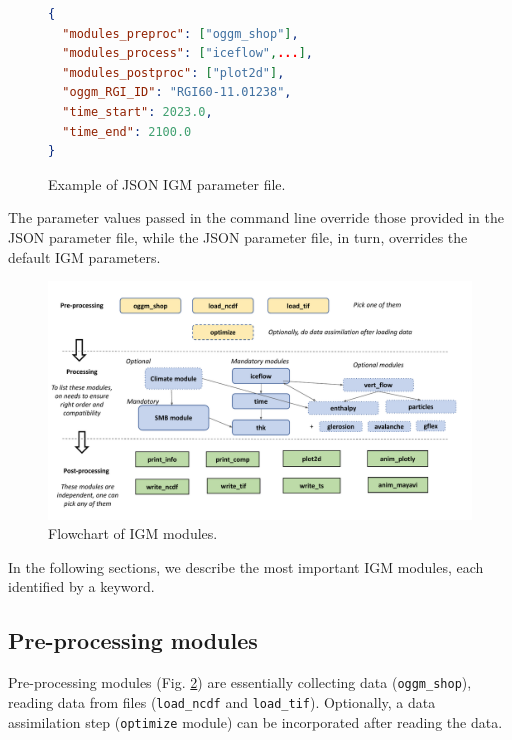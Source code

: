 \documentclass[10pt,twocolumn]{article}
\begin{document}
\begin{figure}[!h]  
\begin{lstlisting}[language=json,numbers=none,framexleftmargin=0pt]
{
  "modules_preproc": ["oggm_shop"],
  "modules_process": ["iceflow",...],
  "modules_postproc": ["plot2d"],
  "oggm_RGI_ID": "RGI60-11.01238",
  "time_start": 2023.0,
  "time_end": 2100.0
}
\end{lstlisting}
\caption{Example of JSON IGM parameter file. \label{ex_json}}
\end{figure}
 
The parameter values passed in the command line  override
those provided in the JSON parameter file, while the JSON parameter file, in turn, 
overrides the default IGM parameters. 

\begin{figure}[!ht]
\begin{center}
\includegraphics[width=\textwidth]{fig/IGM-modules-flowchart.pdf}
\caption{Flowchart of IGM modules.}
\label{flowchart}
\end{center}
\end{figure}

In the following sections, we describe the most important 
IGM modules, each identified by a keyword.

\subsection{Pre-processing modules}

Pre-processing modules (Fig. \ref{flowchart}) are essentially collecting data (\texttt{oggm\_shop}),
reading data from files (\texttt{load\_ncdf} and \texttt{load\_tif}).
Optionally, a data assimilation step (\texttt{optimize} module) can be incorporated after reading the data.
\end{document}
